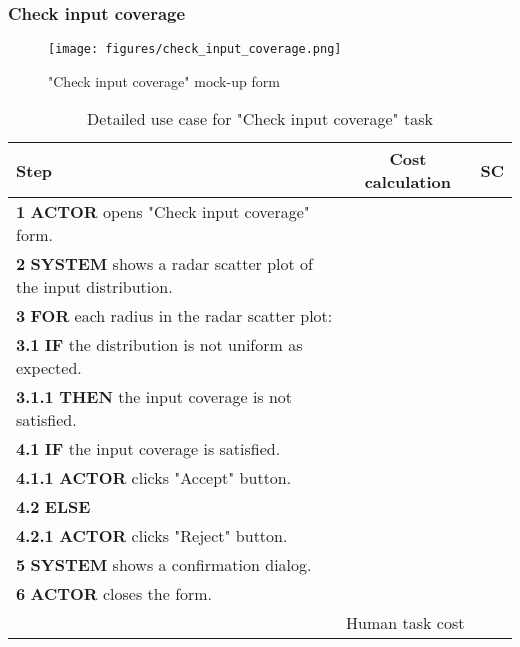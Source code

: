 \subsubsection{Check input coverage}

\begin{figure}[H]
\centering
\texttt{[image: figures/check\_input\_coverage.png]}
\caption{"Check input coverage" mock-up form}
\end{figure}

\begin{table}[H]
\centering
\begin{tabular}{|l|c|c|}
\hline
\textbf{Step} & \textbf{Cost calculation} & \textbf{SC} \\
\hline
\textbf{1} \textbf{ACTOR} opens "Check input coverage" form. & & \\
\hline
\textbf{2} \textbf{SYSTEM} shows a radar scatter plot of the input distribution. & & \\
\hline
\textbf{3} \textbf{FOR} each radius in the radar scatter plot: & & \\
\hline
\textbf{3.1} \textbf{IF} the distribution is not uniform as expected. & & \\
\hline
\textbf{3.1.1} \textbf{THEN} the input coverage is not satisfied. & & \\
\hline
\textbf{4.1} \textbf{IF} the input coverage is satisfied. & & \\
\hline
\textbf{4.1.1} \textbf{ACTOR} clicks "Accept" button. & & \\
\hline
\textbf{4.2} \textbf{ELSE} & & \\
\hline
\textbf{4.2.1} \textbf{ACTOR} clicks "Reject" button. & & \\
\hline
\textbf{5} \textbf{SYSTEM} shows a confirmation dialog. & & \\
\hline
\textbf{6} \textbf{ACTOR} closes the form. & & \\
\hline
\multicolumn{2}{|r|}{Human task cost} & \\
\hline
\end{tabular}
\caption{Detailed use case for "Check input coverage" task}
\label{table:check_input_coverage}
\end{table}
